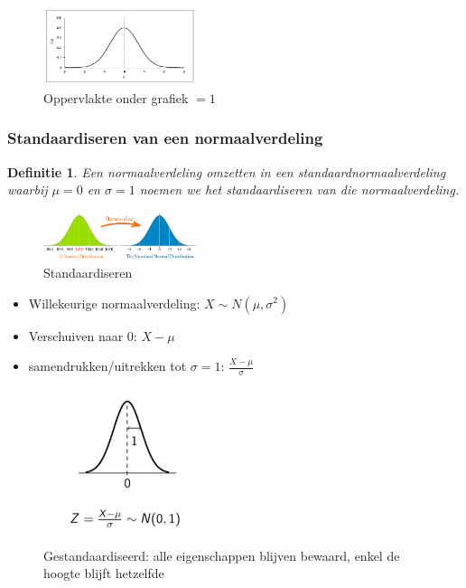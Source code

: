 \documentclass{article}
\newtheorem{theorem}{Definitie}[section]
\begin{document}
\begin{figure}[H]
    \centering
    \includegraphics[width=0.4\textwidth]{standaardnormaalverdeling.png}
    \caption{Oppervlakte onder grafiek $=1$}
\end{figure}

\subsubsection{Standaardiseren van een normaalverdeling}

\begin{theorem}
    Een normaalverdeling omzetten in een standaardnormaalverdeling waarbij $\mu = 0$ en $\sigma = 1$ noemen we het standaardiseren van die normaalverdeling.
\end{theorem}


\begin{figure}[H]
    \centering
    \includegraphics[width=0.4\textwidth]{standardizeren.png}
    \caption{Standaardiseren}
\end{figure}

\begin{itemize}
    \item Willekeurige normaalverdeling: $X \sim N(\mu, \sigma^2)$
    \item Verschuiven naar $0$: $X - \mu$
    \item samendrukken/uitrekken tot $\sigma = 1$: $\frac{X - \mu}{\sigma}$
\end{itemize}


\begin{figure}[H]
    \centering
    \includegraphics[width=0.4\textwidth]{gestandardizeerd.png}
    \caption{Gestandaardiseerd: alle eigenschappen blijven bewaard, enkel de hoogte blijft hetzelfde}
\end{figure}
\end{document}

